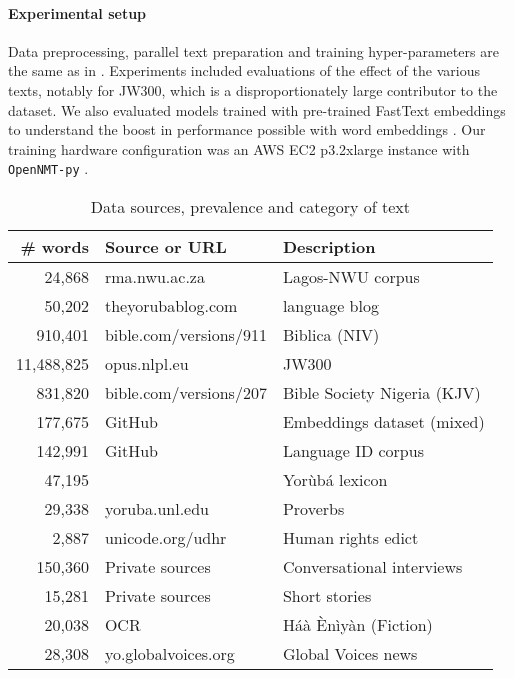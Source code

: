 \documentclass{article} %
\begin{document}
\paragraph{Experimental setup}\label{sec:experimental}
Data preprocessing, parallel text preparation and training hyper-parameters are the same as in \citep{orife2018adr}. Experiments included evaluations of the effect of the various texts, notably for JW300, which is a disproportionately large contributor to the dataset. We also evaluated models trained with pre-trained FastText embeddings to understand the boost in performance possible with word embeddings \citep{alabi2019massive, bojanowski2017enriching}. Our training hardware configuration was an AWS EC2 p3.2xlarge instance with \texttt{OpenNMT-py} \citep{opennmt}.

 \begin{table}[h]
  \caption{Data sources, prevalence and category of text}
  \label{tab:training_datasets}
  \begin{center}
  \begin{tabular}{rll}
    \toprule
    \textbf{\# words} & \textbf{Source or URL}  & \textbf{Description} \\
    \midrule
    24,868 & rma.nwu.ac.za  & Lagos-NWU corpus \\  
    50,202 & theyorubablog.com & language blog\\  
    910,401 & bible.com/versions/911 & Biblica (NIV) \\
    \midrule
    11,488,825 & opus.nlpl.eu & JW300 \\
    831,820 & bible.com/versions/207 & Bible Society Nigeria (KJV)\\
    177,675 & GitHub & Embeddings dataset (mixed) \\
    142,991 & GitHub & Language ID corpus \\
    47,195 &  & Yor{\`u}b{\'a} lexicon \\
    29,338 & yoruba.unl.edu & Proverbs \\
    2,887 & unicode.org/udhr & Human rights edict \\
    \midrule
    150,360 & Private sources & Conversational interviews \\
    15,281 & Private sources & Short stories \\
    20,038 & OCR & H{\'a}{\`a} {\`E}n{\`i}y{\`a}n (Fiction) \\
    \midrule
    \midrule
    28,308 & yo.globalvoices.org & Global Voices news \\
    \bottomrule
  \end{tabular}
  \end{center}
\end{table}
\end{document}
